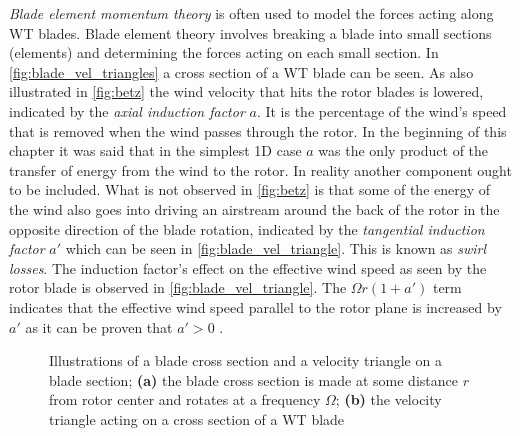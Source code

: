 \smallskip
\textit{Blade element momentum theory} is often used to model the forces acting along WT blades. Blade element theory involves breaking a blade into small sections (elements) and determining the forces acting on each small section. In \cref{fig:blade_vel_triangles} a cross section of a WT blade can be seen. As also illustrated in \cref{fig:betz} the wind velocity that hits the rotor blades is lowered, indicated by the \textit{axial induction factor} $ a $. It is the percentage of the wind's speed that is removed when the wind passes through the rotor. In the beginning of this chapter it was said that in the simplest 1D case $ a $ was the only product of the transfer of energy from the wind to the rotor. In reality another component ought to be included. What is not observed in \cref{fig:betz} is that some of the energy of the wind also goes into driving an airstream around the back of the rotor in the opposite direction of the blade rotation, indicated by the \textit{tangential induction factor} $ a' $ which can be seen in \cref{fig:blade_vel_triangle}. This is known as \textit{swirl losses}. The induction factor's effect on the effective wind speed as seen by the rotor blade is observed in \cref{fig:blade_vel_triangle}. The $ \Omega r (1+a') $ term indicates that the effective wind speed parallel to the rotor plane is increased by $ a' $ as it can be proven that $ a' > 0 $ \cite{Valentine2015}.
\begin{figure}[ht]
	\centering
	\hfil
	\caption{Illustrations of a blade cross section and a velocity triangle on a blade section; \textbf{(a)} the blade cross section is made at some distance $ r $ from rotor center and rotates at a frequency $ \Omega $; \textbf{(b)} the velocity triangle acting on a cross section of a WT blade}
	\label{fig:blade_triangles}
\end{figure}

